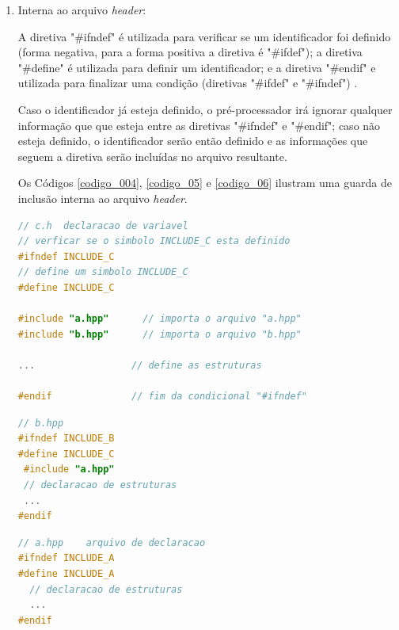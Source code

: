 \begin{enumerate}
\item Interna ao arquivo \textit{header}:

A diretiva "\#ifndef" é utilizada para verificar se um identificador foi 
 definido (forma negativa, para a forma positiva a diretiva é "\#ifdef"); a 
diretiva "\#define" é utilizada para definir um identificador; e a diretiva 
"\#endif" e utilizada para finalizar  uma condição (diretivas "\#ifdef" e 
"\#ifndef") \cite{ref42}.

Caso o identificador já esteja definido, o pré-processador irá ignorar 
qualquer informação que que esteja entre as diretivas "\#ifndef"  e "\#endif";
 caso não esteja definido, o identificador serão então definido e as informações
 que seguem a diretiva serão incluídas no arquivo resultante\cite{ref42}.

Os Códigos \ref{codigo_004}, \ref{codigo_05} e \ref{codigo_06} ilustram uma 
guarda de inclusão interna ao arquivo \textit{header}.

\begin{lstlisting}[language=C++,frame=single,captionpos=b,caption={
									Arquivo c.hpp contendo guardas
													 de inclusão interna},
                                                            label=codigo_004]
// c.h  declaracao de variavel
// verficar se o simbolo INCLUDE_C esta definido
#ifndef INCLUDE_C   
// define um simbolo INCLUDE_C
#define INCLUDE_C   

#include "a.hpp"      // importa o arquivo "a.hpp"
#include "b.hpp"      // importa o arquivo "b.hpp"

...                 // define as estruturas

#endif              // fim da condicional "#ifndef" 
\end{lstlisting}

\begin{lstlisting}[language=C++,frame=single,captionpos=b,caption={
                                     Arquivo b.hpp que inclue o arquivo a.h},
                                                            label=codigo_05]
// b.hpp
#ifndef INCLUDE_B
#define INCLUDE_C
 #include "a.hpp"
 // declaracao de estruturas 
 ...
#endif    
\end{lstlisting}

\begin{lstlisting}[language=C++,frame=single,captionpos=b,caption={Arquivo a.hpp 
                                    contendo guardas de inclusão interna},
                                                            label=codigo_06]
// a.hpp    arquivo de declaracao
#ifndef INCLUDE_A
#define INCLUDE_A
  // declaracao de estruturas 
  ...
#endif
\end{lstlisting}



\end{enumerate}
